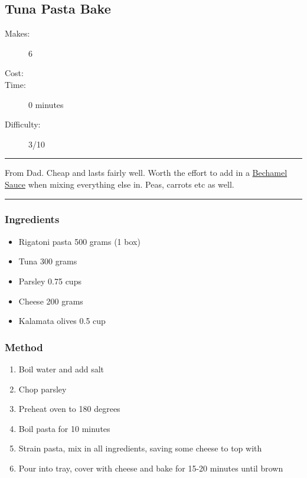 \documentclass[]{article}
\begin{document}
\subsection*{\center\huge Tuna Pasta Bake}
\begin{description}
\item[Makes:] 6 
\item[Cost:] \textdollar
\item[Time:] 0 minutes
\item[Difficulty:] 3/10
\end{description}
\vspace{0.2cm}\hrule\vspace{0.5cm}
\begin{adjustwidth}{0.5 cm}{0.5 cm}

From Dad. Cheap and lasts fairly well. Worth the effort to add in a \hyperref[rec:Bechamel]{Bechamel Sauce} when mixing everything else in. Peas, carrots etc as well. \hfill{}\color{black}

\end{adjustwidth}
\vspace{0.5cm}\hrule
\subsubsection*{\Large Ingredients}
\begin{multicols}{2}
\begin{itemize}
 \item Rigatoni pasta \hfill 500 grams (1 box)
 \item Tuna \hfill 300 grams
 \item Parsley \hfill 0.75 cups
 \item Cheese \hfill 200 grams
 \item Kalamata olives \hfill 0.5 cup
\end{itemize}
\end{multicols}
\subsubsection*{\Large Method}
\begin{enumerate}[font=\huge\color{accent}]
	\item Boil water and add salt
	\item Chop parsley
	\item Preheat oven to 180 degrees
	\item Boil pasta for 10 minutes
	\item Strain pasta, mix in all ingredients, saving some cheese to top with
	\item Pour into tray, cover with cheese and bake for 15-20 minutes until brown
\end{enumerate}
\newpage
{}
\end{document}
